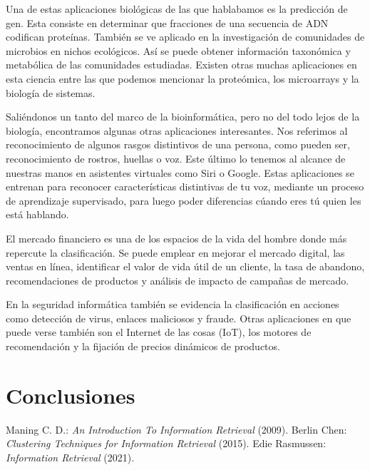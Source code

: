 \documentclass{llncs}
\begin{document}
Una de estas aplicaciones biol\'ogicas de las que hablabamos es la predicci\'on de gen. Esta consiste en determinar que fracciones de una secuencia de ADN codifican prote\'inas. Tambi\'en se ve aplicado en la investigaci\'on de comunidades de microbios en nichos ecol\'ogicos. As\'i se puede obtener informaci\'on taxon\'omica y metab\'olica de las comunidades estudiadas. Existen otras muchas aplicaciones en esta ciencia entre las que podemos mencionar la prote\'omica, los microarrays y la biolog\'ia de sistemas.

Sali\'endonos un tanto del marco de la bioinform\'atica, pero no del todo lejos de la biolog\'ia, encontramos algunas otras aplicaciones interesantes. Nos referimos al reconocimiento de algunos rasgos distintivos de una persona, como pueden ser, reconocimiento de rostros, huellas o voz. Este \'ultimo lo tenemos al alcance de nuestras manos en asistentes virtuales como Siri o  Google. Estas aplicaciones se entrenan para reconocer caracter\'isticas distintivas de tu voz, mediante un proceso de aprendizaje supervisado, para luego poder diferencias c\'uando eres t\'u quien les est\'a hablando.

El mercado financiero es una de los espacios de la vida del hombre donde m\'as repercute la clasificaci\'on. Se puede emplear en mejorar el mercado digital, las ventas en l\'inea, identificar el valor de vida \'util de un cliente, la tasa de abandono, recomendaciones de productos y an\'alisis de impacto de campa\~nas de mercado.

En la seguridad inform\'atica tambi\'en se evidencia la clasificaci\'on en acciones como detecci\'on de virus, enlaces maliciosos y fraude. Otras aplicaciones en que puede verse tambi\'en son el Internet de las cosas (IoT), los motores de recomendaci\'on y la fijaci\'on de precios din\'amicos de productos.

\section{Conclusiones}

\begin{thebibliography}{20}
	 Maning C. D.: \emph{An Introduction To Information Retrieval} (2009).
	 Berlin Chen: \emph{Clustering Techniques for
		Information Retrieval} (2015).
	 Edie Rasmussen: \emph{Information Retrieval} (2021).
\end{thebibliography}
\end{document}
